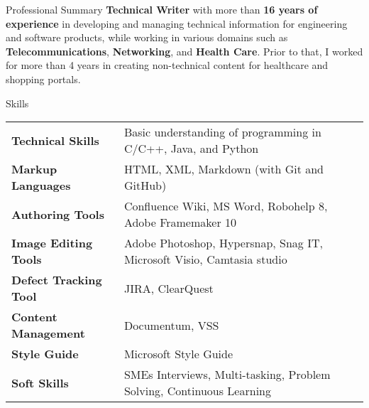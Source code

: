 \documentclass{resume} %
\begin{document}

\begin{rSection}{Professional Summary}
{\bf Technical Writer} with more than {\bf 16 years of experience} in developing and managing technical information for engineering and software products, while working in various domains such as {\bf Telecommunications}, {\bf Networking}, and {\bf Health Care}. Prior to that, I worked for more than 4 years in creating non-technical content for healthcare and shopping portals.
\end{rSection}


\begin{rSection}{Skills}

\begin{tabular}{ @{} >{\bfseries}l @{\hspace{6ex}} l }
Technical Skills & Basic understanding of programming in C/C++, Java, and Python\\
Markup Languages & HTML, XML, Markdown (with Git and GitHub) \\
Authoring Tools & Confluence Wiki, MS Word, Robohelp 8, Adobe Framemaker 10 \\
Image Editing Tools & Adobe Photoshop, Hypersnap, Snag IT, Microsoft Visio, Camtasia studio \\
Defect Tracking Tool & JIRA, ClearQuest \\ 
Content Management & Documentum, VSS \\ 
Style Guide & Microsoft Style Guide \\ 
Soft Skills & SMEs Interviews, Multi-tasking, Problem Solving, Continuous Learning
\end{tabular}

\end{rSection}


\end{document}
